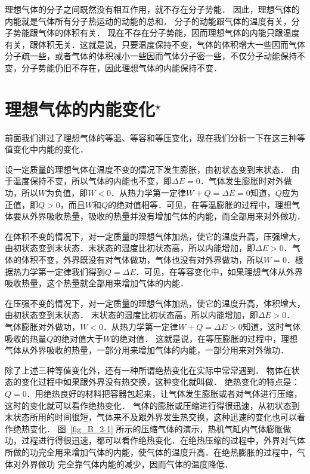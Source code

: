 理想气体的分子之间既然没有相互作用，就不存在分子势能．
因此，理想气体的内能就是气体所有分子热运动的动能的总和．
分子的动能跟气体的温度有关，分子势能跟气体的体积有关．
现在不存在分子势能，因而理想气体的内能只跟温度有关，跟体积无关．这就是说，只要温度保持不变，气体的体积增大一些因而气体分子疏一些，或者气体的体积减小一些因而气体分子密一些，不仅分子动能保持不变，分子势能仍旧不存在，因此理想气体的内能保持不变．

\section{理想气体的内能变化$^\star$}
前面我们讲过了理想气体的等温、等容和等压变化，现在我们分析一下在这三种等值变化中内能的变化．

设一定质量的理想气体在温度不变的情况下发生膨胀，由初状态变到末状态．
由于温度保持不变，所以气体的内能也不变，即$\Delta E=0$．气体发生膨胀时对外做功，所以$W$为负值，即$W<0$．从热力学第一定律$W+Q=\Delta E=0$知道，$Q$应为正值，即$Q>0$，而且$W$和$Q$的绝对值相等．可见，在等温膨胀的过程中，理想气体要从外界吸收热量，吸收的热量并没有增加气体的内能，而全部用来对外做功．

在体积不变的情况下，对一定质量的理想气体加热，使它的温度升高，压强增大，由初状态变到末状态．末状态的温度比初状态高，所以内能增加，即$\Delta E>0$．气体的体积不变，外界既没有对气体做功，气体也没有对外界做功，所以$W=0$．根据热力学第一定律我们得到$Q=\Delta E$．可见，在等容变化中，如果理想气体从外界吸收热量，这个热量就全部用来增加气体的内能．

在压强不变的情况下，对一定质量的理想气体加热，使它的温度升高，体积增大，由初状态变到末状态．
末状态的温度比初状态高，所以内能增加，即$\Delta E>0$．
气体膨胀对外做功，$W<0$．从热力学第一定律$W+Q=\Delta E>0$知道，这时气体吸收的热量$Q$的绝对值大于$W$的绝对值．
这就是说，在等压膨胀的过程中，理想气体从外界吸收的热量，一部分用来增加气体的内能，一部分用来对外做功．

除了上述三种等值变化外，还有一种所谓绝热变化在实际中常常遇到．
物体在状态的变化过程中如果跟外界没有热交换，这种变化就叫做．
绝热变化的特点是：$Q=0$．用绝热良好的材料把容器包起来，让气体发生膨胀或者对气体进行压缩，这时的变化就可以看作绝热变化．
气体的膨胀或压缩进行得很迅速，从初状态到末状态所用的时间很短，气体来不及跟外界发生热交换，这种迅速的变化也可以看作绝热变化．
图~\ref{fig_B_2-1} 所示的压缩气体的演示，热机气缸内气体膨胀做功，过程进行得很迅速，都可以看作绝热变化．在绝热压缩的过程中，外界对气体所做的功完全用来增加气体的内能，使气体的温度升高．在绝热膨胀的过程中，气体对外界做功
完全靠气体内能的减少，因而气体的温度降低．


